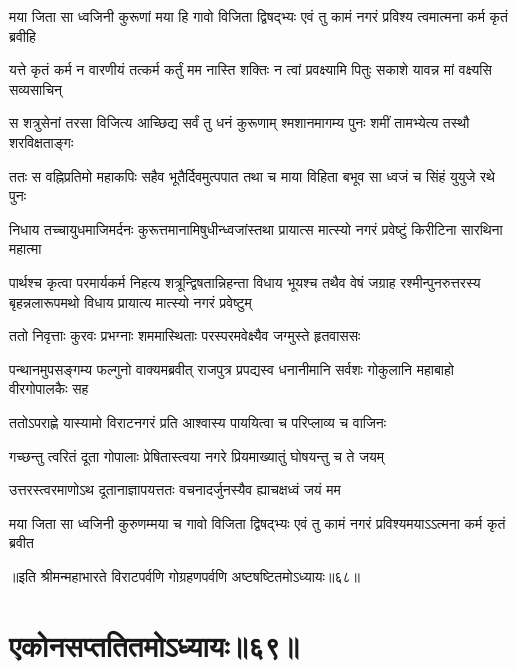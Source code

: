 \twolineshloka
{मया जिता सा ध्वजिनी कुरूणां मया हि गावो विजिता द्विषद्भ्यः}
{एवं तु कामं नगरं प्रविश्य त्वमात्मना कर्म कृतं ब्रवीहि}




\twolineshloka
{यत्ते कृतं कर्म न वारणीयं तत्कर्म कर्तुं मम नास्ति शक्तिः}
{न त्वां प्रवक्ष्यामि पितुः सकाशे यावन्न मां वक्ष्यसि सव्यसाचिन्}




\twolineshloka
{स शत्रुसेनां तरसा विजित्य आच्छिद्य सर्वं तु धनं कुरूणाम्}
{श्मशानमागम्य पुनः शमीं तामभ्येत्य तस्थौ शरविक्षताङ्गः}


\twolineshloka
{ततः स वह्निप्रतिमो महाकपिः सहैव भूतैर्दिवमुत्पपात}
{तथा च माया विहिता बभूव सा ध्वजं च सिंहं युयुजे रथे पुनः}


\twolineshloka
{निधाय तच्चायुधमाजिमर्दनः कुरूत्तमानामिषुधीन्ध्वजांस्तथा}
{प्रायात्स मात्स्यो नगरं प्रवेष्टुं किरीटिना सारथिना महात्मा}


\threelineshloka
{पार्थश्च कृत्वा परमार्यकर्म निहत्य शत्रून्द्विषतान्निहन्ता}
{विधाय भूयश्च तथैव वेषं जग्राह रश्मीन्पुनरुत्तरस्य}
{बृहन्नलारूपमथो विधाय प्रायात्य मात्स्यो नगरं प्रवेष्टुम्}



\twolineshloka
{ततो निवृत्ताः कुरवः प्रभग्नाः शममास्थिताः}
{परस्परमवेक्ष्यैव जग्मुस्ते हृतवाससः}


\threelineshloka
{पन्थानमुपसङ्गम्य फल्गुनो वाक्यमब्रवीत्}
{राजपुत्र प्रपद्यस्व धनानीमानि सर्वशः}
{गोकुलानि महाबाहो वीरगोपालकैः सह}


\twolineshloka
{ततोऽपराह्णे यास्यामो विराटनगरं प्रति}
{आश्वास्य पाययित्वा च परिप्लाव्य च वाजिनः}



\twolineshloka
{गच्छन्तु त्वरितं दूता गोपालाः प्रेषितास्त्वया}
{नगरे प्रियमाख्यातुं घोषयन्तु च ते जयम्}


\twolineshloka
{उत्तरस्त्वरमाणोऽथ दूतानाज्ञापयत्ततः}
{वचनादर्जुनस्यैव ह्याचक्षध्वं जयं मम}


\twolineshloka
{मया जिता सा ध्वजिनी कुरुणम्मया च गावो विजिता द्विषद्भ्यः}
{एवं तु कामं नगरं प्रविश्यमयाऽऽत्मना कर्म कृतं ब्रवीत}

॥इति श्रीमन्महाभारते विराटपर्वणि गोग्रहणपर्वणि अष्टषष्टितमोऽध्यायः॥६८॥

\chapter{एकोनसप्ततितमोऽध्यायः॥६९॥}

